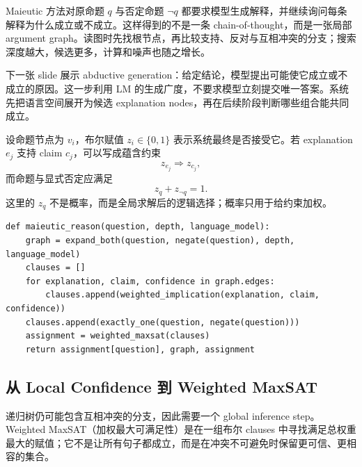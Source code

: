 Maieutic 方法对原命题 $q$ 与否定命题 $\neg q$ 都要求模型生成解释，并继续询问每条解释为什么成立或不成立。这样得到的不是一条 chain-of-thought，而是一张局部 argument graph。读图时先找根节点，再比较支持、反对与互相冲突的分支；搜索深度越大，候选更多，计算和噪声也随之增长。


下一张 slide 展示 abductive generation：给定结论，模型提出可能使它成立或不成立的原因。这一步利用 LM 的生成广度，不要求模型立刻提交唯一答案。系统先把语言空间展开为候选 explanation nodes，再在后续阶段判断哪些组合能共同成立。


设命题节点为 $v_i$，布尔赋值 $z_i\in\{0,1\}$ 表示系统最终是否接受它。若 explanation $e_j$ 支持 claim $c_j$，可以写成蕴含约束
\begin{equation}
z_{e_j}\Rightarrow z_{c_j},
\end{equation}
而命题与显式否定应满足
\begin{equation}
z_q+z_{\neg q}=1.
\end{equation}
这里的 $z_q$ 不是概率，而是全局求解后的逻辑选择；概率只用于给约束加权。

\begin{lstlisting}[caption={Maieutic Prompting 的递归解释与全局一致性伪代码}]
def maieutic_reason(question, depth, language_model):
    graph = expand_both(question, negate(question), depth, language_model)
    clauses = []
    for explanation, claim, confidence in graph.edges:
        clauses.append(weighted_implication(explanation, claim, confidence))
    clauses.append(exactly_one(question, negate(question)))
    assignment = weighted_maxsat(clauses)
    return assignment[question], graph, assignment
\end{lstlisting}

\subsection{从 Local Confidence 到 Weighted MaxSAT}

递归树仍可能包含互相冲突的分支，因此需要一个 global inference step。Weighted MaxSAT（加权最大可满足性）是在一组布尔 clauses 中寻找满足总权重最大的赋值；它不是让所有句子都成立，而是在冲突不可避免时保留更可信、更相容的集合。

